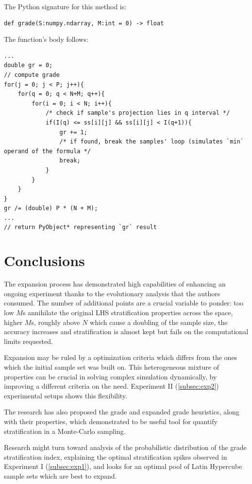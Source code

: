 \documentclass[12pt]{extarticle}
\begin{document}
The Python signature for this method is:
\begin{lstlisting}[style=CStyle]
def grade(S:numpy.ndarray, M:int = 0) -> float
\end{lstlisting}

The function's body follows:
\begin{lstlisting}[style=CStyle]
...
double gr = 0;
// compute grade
for(j = 0; j < P; j++){
    for(q = 0; q < N+M; q++){
        for(i = 0; i < N; i++){
        	/* check if sample's projection lies in q interval */
            if(I(q) <= ss[i][j] && ss[i][j] < I(q+1)){
                gr += 1;
                /* if found, break the samples' loop (simulates `min` operand of the formula */
                break;
            }
        }
    }
}
gr /= (double) P * (N + M);
...
// return PyObject* representing `gr` result
\end{lstlisting}

\section{Conclusions}
\label{sec:conclusions}
The expansion process has demonstrated high capabilities of enhancing an ongoing experiment thanks to the evolutionary analysis that the authors consumed. The number of additional points are a crucial variable to ponder: too low $M$s annihilate the original LHS stratification properties across the space, higher $M$s, roughly above $N$ which cause a doubling of the sample size, the accuracy increases and stratification is almost kept but fails on the computational limits requested.

Expansion may be ruled by a optimization criteria which differs from the ones which the initial sample set was built on. This heterogeneous mixture of properties can be crucial in solving complex simulation dynamically, by improving a different criteria on the need. Experiment II (\cref{subsec:exp2}) experimental setups shows this flexibility.

The research has also proposed the grade and expanded grade heuristics, along with their properties, which demonstrated to be useful tool for quantify stratification in a Monte-Carlo sampling. 

Research might turn toward analysis of the probabilistic distribution of the grade stratification index, explaining the optimal stratification spikes observed in Experiment I (\cref{subsec:exp1}), and looks for an optimal pool of Latin Hypercube sample sets which are best to expand.
\end{document}
